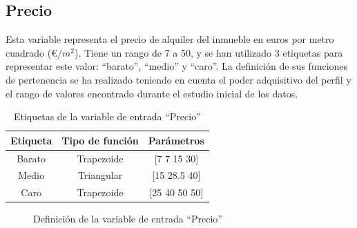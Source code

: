 \documentclass[12pt]{report} %
\begin{document}
        \subsection{Precio}
        Esta variable representa el precio de alquiler del inmueble en euros por metro cuadrado (€$/m^2$).
        Tiene un rango de 7 a 50, y se han utilizado 3 etiquetas para representar este valor: ``barato'', ``medio'' y ``caro''.
        La definición de sus funciones de pertenencia se ha realizado teniendo en cuenta el poder adquisitivo del perfil
         y el rango de valores encontrado durante el estudio inicial de los datos.

        \begin{table}[h]
            \center
            \begin{tabular}{@{}ccc@{}}
                \toprule
                \textbf{Etiqueta} & \textbf{Tipo de función} & \textbf{Parámetros} \\
                \midrule
                Barato & Trapezoide & [7 7 15 30]   \\
                Medio  & Triangular & [15 28.5 40]  \\
                Caro   & Trapezoide & [25 40 50 50] \\
                \bottomrule
            \end{tabular}
            \caption{Etiquetas de la variable de entrada ``Precio''}
        \end{table}

        \begin{figure}[H]
            \centering
            \caption{Definición de la variable de entrada ``Precio''}
        \end{figure}
\end{document}
